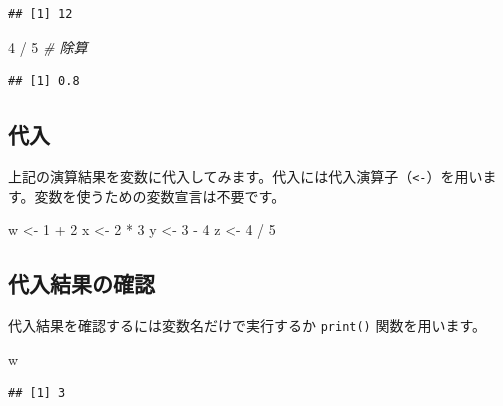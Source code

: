 \documentclass[
  12pt,
]{book}
\newenvironment{Shaded}{\begin{snugshade}}{\end{snugshade}}
\newcommand{\CommentTok}[1]{\textcolor[rgb]{0.56,0.35,0.01}{\textit{#1}}}
\newcommand{\DecValTok}[1]{\textcolor[rgb]{0.00,0.00,0.81}{#1}}
\newcommand{\NormalTok}[1]{#1}
\newcommand{\OtherTok}[1]{\textcolor[rgb]{0.56,0.35,0.01}{#1}}
\newcommand{\SpecialCharTok}[1]{\textcolor[rgb]{0.00,0.00,0.00}{#1}}
\begin{document}
\begin{verbatim}
## [1] 12
\end{verbatim}

\begin{Shaded}
\begin{Highlighting}[numbers=left,,]
\DecValTok{4} \SpecialCharTok{/} \DecValTok{5}     \CommentTok{\# 除算}
\end{Highlighting}
\end{Shaded}

\begin{verbatim}
## [1] 0.8
\end{verbatim}

\hypertarget{ux4ee3ux5165}{%
\subsection{代入}\label{ux4ee3ux5165}}

上記の演算結果を変数に代入してみます。代入には代入演算子（\texttt{\textless{}-}）を用います。変数を使うための変数宣言は不要です。

\begin{Shaded}
\begin{Highlighting}[numbers=left,,]
\NormalTok{w }\OtherTok{\textless{}{-}} \DecValTok{1} \SpecialCharTok{+} \DecValTok{2}
\NormalTok{x }\OtherTok{\textless{}{-}} \DecValTok{2} \SpecialCharTok{*} \DecValTok{3}
\NormalTok{y }\OtherTok{\textless{}{-}} \DecValTok{3} \SpecialCharTok{{-}} \DecValTok{4}
\NormalTok{z }\OtherTok{\textless{}{-}} \DecValTok{4} \SpecialCharTok{/} \DecValTok{5}
\end{Highlighting}
\end{Shaded}

\hypertarget{ux4ee3ux5165ux7d50ux679cux306eux78baux8a8d}{%
\subsection{代入結果の確認}\label{ux4ee3ux5165ux7d50ux679cux306eux78baux8a8d}}

代入結果を確認するには変数名だけで実行するか \texttt{print()} 関数を用います。

\begin{Shaded}
\begin{Highlighting}[numbers=left,,]
\NormalTok{w}
\end{Highlighting}
\end{Shaded}

\begin{verbatim}
## [1] 3
\end{verbatim}
\end{document}
